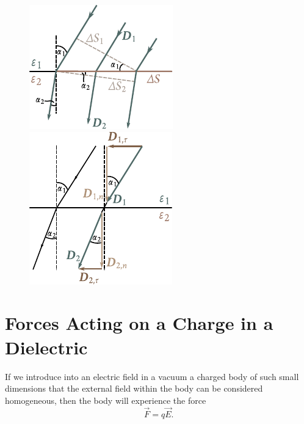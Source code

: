 \begin{figure}[t]
	\begin{minipage}[t]{0.48\linewidth}
		\begin{center}
			\includegraphics[scale=1.1]{figures/ch_02/fig_2_11.pdf}
			\caption[]{}
			\label{fig:2_11}
		\end{center}
	\end{minipage}
	\hfill{}%
	\begin{minipage}[t]{0.48\linewidth}
		\begin{center}
			\includegraphics[scale=1.1]{figures/ch_02/fig_2_12.pdf}
			\caption[]{}
			\label{fig:2_12}
		\end{center}
	\end{minipage}
\vspace{-0.4cm}
\end{figure}

\section{Forces Acting on a Charge in a Dielectric}\label{sec:2_8}

If we introduce into an electric field in a vacuum a charged body of such small dimensions that the external field within the body can be considered homogeneous, then the body will experience the force
\begin{equation}\label{eq:2_50}
    \vec{F} = q \vec{E}.
\end{equation}

